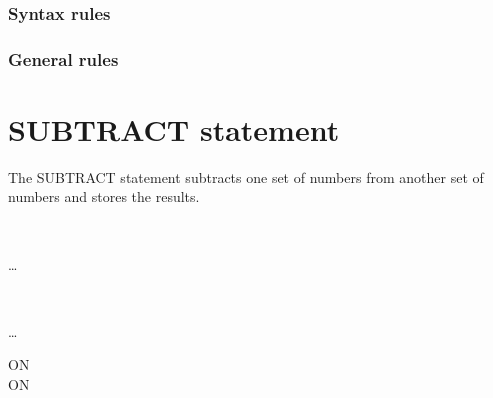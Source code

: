 \subsubsection{Syntax rules}

\subsubsection{General rules}

\section{SUBTRACT statement}

The SUBTRACT statement subtracts one set of numbers from another set of numbers and stores the results.

\begin{syntax}
  \begin{1=}
    \identifier \\
    \literal
  \end{1=} \ldots
  \begin{1=}
    \begin{1=}
      \identifier \\
      \literal
    \end{1=}
    \begin{0-1}
    \end{0-1}
  \end{1=} \ldots

  \begin{0+}
    ON   \imperativestatement \\
     ON   \imperativestatement
  \end{0+}

  \begin{0-1}
  \end{0-1}
\end{syntax}


